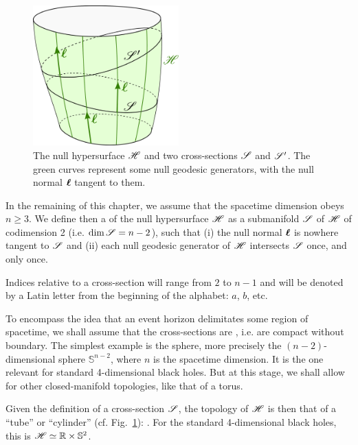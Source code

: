 \begin{figure}
\centerline{\includegraphics[width=0.5\textwidth]{def_cross_sections.pdf}}
\caption[]{\label{f:def:hor_cylinder} \footnotesize
The null hypersurface $\mathscr{H}$ and two cross-sections $\mathscr{S}$ and $\mathscr{S}'$.
The green curves represent some null geodesic generators, with the null normal
$\bm{\ell}$ tangent to them.}
\end{figure}

In the remaining of this chapter, we assume that the spacetime dimension
obeys $n\geq 3$. We define then a 
of the null hypersurface $\mathscr{H}$
as a submanifold $\mathscr{S}$ of $\mathscr{H}$ of codimension 2 (i.e. $\dim \mathscr{S}=n-2$),
such that (i) the null normal $\bm{\ell}$ is nowhere tangent to $\mathscr{S}$ and (ii)
each null geodesic generator of $\mathscr{H}$ intersects $\mathscr{S}$ once, and only once.

\begin{notation}
Indices relative to a cross-section will range from $2$ to $n-1$ and
will be denoted by a Latin letter from the beginning of the alphabet: $a$, $b$, etc.
\end{notation}

To encompass the idea that an event horizon delimitates some
region of spacetime, we shall assume that the cross-sections
are , i.e.
are compact without boundary. The simplest example is the sphere,
more precisely the $(n-2)$-dimensional sphere $\mathbb{S}^{n-2}$, where $n$
is the spacetime dimension. It is the one relevant for standard 4-dimensional
black holes. But at this stage, we shall allow for other
closed-manifold topologies, like that of a torus.

Given the definition of a cross-section $\mathscr{S}$,
the topology of $\mathscr{H}$ is then that of a ``tube'' or ``cylinder''
(cf. Fig.~\ref{f:def:hor_cylinder}):
\be \label{e:def:H_topology}
    \Hor \simeq \R \times \Sp.
\ee
For the standard 4-dimensional black holes, this is
$\mathscr{H} \simeq \mathbb{R} \times \mathbb{S}^{2}$.

